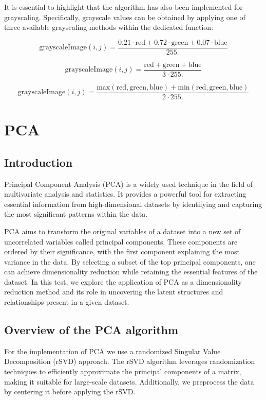 \documentclass{article}
\begin{document}
It is essential to highlight that the algorithm has also been implemented for grayscaling. Specifically, grayscale values can be obtained by applying one of three available grayscaling methods within the dedicated function:
\vspace{\baselineskip}

\[
\text{{grayscaleImage}}(i, j) = \frac{{0.21 \cdot \text{{red}} + 0.72 \cdot \text{{green}} + 0.07 \cdot \text{{blue}}}}{{255.}}
\]

\[
\text{{grayscaleImage}}(i, j) = \frac{{\text{{red}} + \text{{green}} + \text{{blue}}}}{3 \cdot 255.}
\]

\[
\text{{grayscaleImage}}(i, j) = \frac{{\text{{max}}(\text{{red}}, \text{{green}}, \text{{blue}}) + \text{{min}}(\text{{red}}, \text{{green}}, \text{{blue}})}}{2 \cdot 255.}
\]

\newpage

\section{PCA}

\subsection{Introduction}
Principal Component Analysis (PCA) is a widely used technique in the field of multivariate analysis and statistics. It provides a powerful tool for extracting essential information from high-dimensional datasets by identifying and capturing the most significant patterns within the data.

PCA aims to transform the original variables of a dataset into a new set of uncorrelated variables called principal components. These components are ordered by their significance, with the first component explaining the most variance in the data. By selecting a subset of the top principal components, one can achieve dimensionality reduction while retaining the essential features of the dataset. In this test, we explore the application of PCA as a dimensionality reduction method and its role in uncovering the latent structures and relationships present in a given dataset.

\subsection{Overview of the PCA algorithm}
For the implementation of PCA we use a randomized Singular Value Decomposition (rSVD) approach. The rSVD algorithm leverages randomization techniques to efficiently approximate the principal components of a matrix, making it suitable for large-scale datasets. Additionally, we preprocess the data by centering it before applying the rSVD. 
\end{document}
